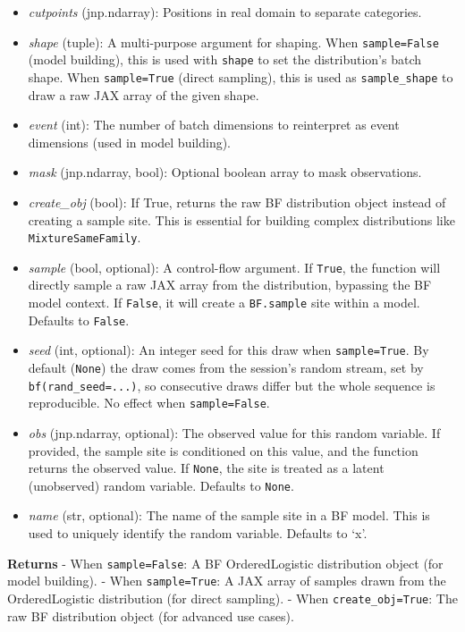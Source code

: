 \documentclass[
  letterpaper,
  DIV=11,
  numbers=noendperiod]{scrartcl}
\begin{document}
\begin{itemize}
\item
  \emph{cutpoints} (jnp.ndarray): Positions in real domain to separate
  categories.
\item
  \emph{shape} (tuple): A multi-purpose argument for shaping. When
  \texttt{sample=False} (model building), this is used with
  \texttt{shape} to set the distribution's batch shape. When
  \texttt{sample=True} (direct sampling), this is used as
  \texttt{sample\_shape} to draw a raw JAX array of the given shape.
\item
  \emph{event} (int): The number of batch dimensions to reinterpret as
  event dimensions (used in model building).
\item
  \emph{mask} (jnp.ndarray, bool): Optional boolean array to mask
  observations.
\item
  \emph{create\_obj} (bool): If True, returns the raw BF distribution
  object instead of creating a sample site. This is essential for
  building complex distributions like \texttt{MixtureSameFamily}.
\item
  \emph{sample} (bool, optional): A control-flow argument. If
  \texttt{True}, the function will directly sample a raw JAX array from
  the distribution, bypassing the BF model context. If \texttt{False},
  it will create a \texttt{BF.sample} site within a model. Defaults to
  \texttt{False}.
\item
  \emph{seed} (int, optional): An integer seed for this draw when
  \texttt{sample=True}. By default (\texttt{None}) the draw comes from
  the session's random stream, set by \texttt{bf(rand\_seed=...)}, so
  consecutive draws differ but the whole sequence is reproducible. No
  effect when \texttt{sample=False}.
\item
  \emph{obs} (jnp.ndarray, optional): The observed value for this random
  variable. If provided, the sample site is conditioned on this value,
  and the function returns the observed value. If \texttt{None}, the
  site is treated as a latent (unobserved) random variable. Defaults to
  \texttt{None}.
\item
  \emph{name} (str, optional): The name of the sample site in a BF
  model. This is used to uniquely identify the random variable. Defaults
  to `x'.
\end{itemize}

\textbf{Returns} - When \texttt{sample=False}: A BF OrderedLogistic
distribution object (for model building). - When \texttt{sample=True}: A
JAX array of samples drawn from the OrderedLogistic distribution (for
direct sampling). - When \texttt{create\_obj=True}: The raw BF
distribution object (for advanced use cases).
\end{document}
